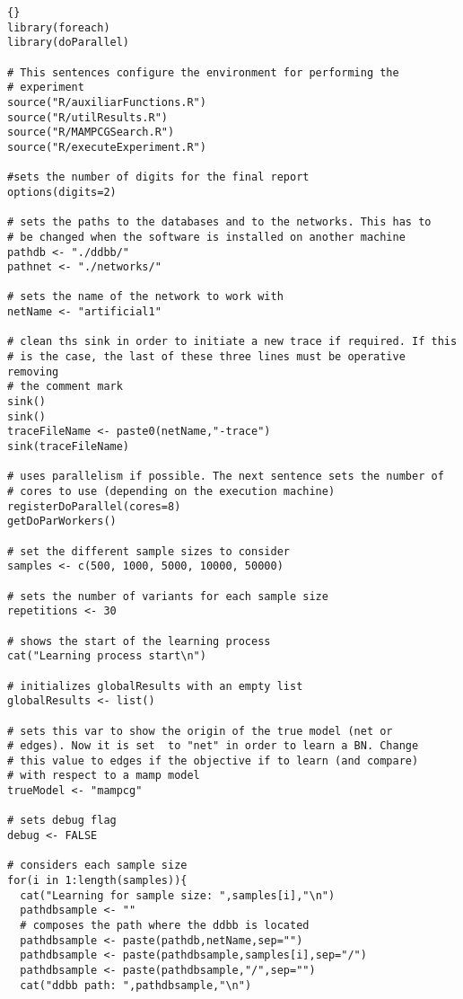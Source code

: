 \documentclass[11pt,professionalfont]{article}
\begin{document}
\begin{small}
\lstset{linewidth=150mm}
\begin{lstlisting}[]{}
library(foreach)
library(doParallel)

# This sentences configure the environment for performing the
# experiment
source("R/auxiliarFunctions.R")
source("R/utilResults.R")
source("R/MAMPCGSearch.R")
source("R/executeExperiment.R")

#sets the number of digits for the final report
options(digits=2)

# sets the paths to the databases and to the networks. This has to
# be changed when the software is installed on another machine
pathdb <- "./ddbb/"
pathnet <- "./networks/"

# sets the name of the network to work with
netName <- "artificial1"

# clean ths sink in order to initiate a new trace if required. If this
# is the case, the last of these three lines must be operative removing
# the comment mark
sink()
sink()
traceFileName <- paste0(netName,"-trace")
sink(traceFileName)

# uses parallelism if possible. The next sentence sets the number of
# cores to use (depending on the execution machine)
registerDoParallel(cores=8)
getDoParWorkers()

# set the different sample sizes to consider
samples <- c(500, 1000, 5000, 10000, 50000)

# sets the number of variants for each sample size
repetitions <- 30

# shows the start of the learning process
cat("Learning process start\n")

# initializes globalResults with an empty list
globalResults <- list()

# sets this var to show the origin of the true model (net or
# edges). Now it is set  to "net" in order to learn a BN. Change
# this value to edges if the objective if to learn (and compare)
# with respect to a mamp model
trueModel <- "mampcg"

# sets debug flag
debug <- FALSE

# considers each sample size
for(i in 1:length(samples)){
  cat("Learning for sample size: ",samples[i],"\n")
  pathdbsample <- ""
  # composes the path where the ddbb is located
  pathdbsample <- paste(pathdb,netName,sep="")
  pathdbsample <- paste(pathdbsample,samples[i],sep="/")
  pathdbsample <- paste(pathdbsample,"/",sep="")
  cat("ddbb path: ",pathdbsample,"\n")
  

\end{lstlisting}
\end{small}
\end{document}

